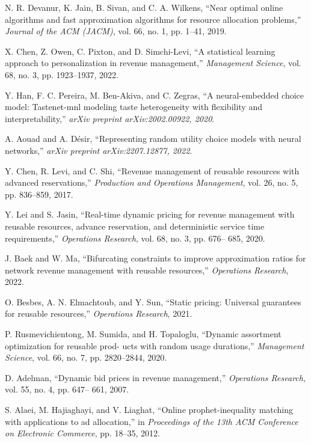 \documentclass[letterpaper, 10 pt, conference]{ieeeconf}  %
\theoremstyle{plain}
\theoremstyle{definition}
\theoremstyle{remark}
\begin{document}
\begin{thebibliography}{99}
N. R. Devanur, K. Jain, B. Sivan, and C. A. Wilkens, “Near optimal online algorithms and fast approximation algorithms for resource allocation problems,” \textit{Journal of the ACM (JACM)}, vol. 66, no. 1, pp. 1–41, 2019.

X. Chen, Z. Owen, C. Pixton, and D. Simchi-Levi, “A statistical learning approach to personalization in
revenue management,” \textit{Management Science}, vol. 68,
no. 3, pp. 1923–1937, 2022.

Y. Han, F. C. Pereira, M. Ben-Akiva, and C. Zegras, “A neural-embedded choice model: Tastenet-mnl modeling
taste heterogeneity with flexibility and interpretability,” \textit{arXiv preprint arXiv:2002.00922, 2020}.

A. Aouad and A. Désir, “Representing random utility choice models with neural networks,” \textit{arXiv preprint arXiv:2207.12877, 2022}.

Y. Chen, R. Levi, and C. Shi, “Revenue management of reusable resources with advanced reservations,” \textit{Production and Operations Management}, vol. 26, no. 5,
pp. 836–859, 2017.

Y. Lei and S. Jasin, “Real-time dynamic pricing for revenue management with reusable resources, advance
reservation, and deterministic service time requirements,” \textit{Operations Research}, vol. 68, no. 3, pp. 676–
685, 2020.

J. Baek and W. Ma, “Bifurcating constraints to improve approximation ratios for network revenue management
with reusable resources,” \textit{Operations Research}, 2022.

O. Besbes, A. N. Elmachtoub, and Y. Sun, “Static pricing: Universal guarantees for reusable resources,” \textit{Operations Research}, 2021.

P. Rusmevichientong, M. Sumida, and H. Topaloglu, “Dynamic assortment optimization for reusable prod-
ucts with random usage durations,” \textit{Management Science}, vol. 66, no. 7, pp. 2820–2844, 2020.

D. Adelman, “Dynamic bid prices in revenue management,” \textit{Operations Research}, vol. 55, no. 4, pp. 647–
661, 2007.

S. Alaei, M. Hajiaghayi, and V. Liaghat, “Online prophet-inequality matching with applications to ad allocation,” in \textit{Proceedings of the 13th ACM Conference
on Electronic Commerce}, pp. 18–35, 2012.


\end{thebibliography}
\end{document}
